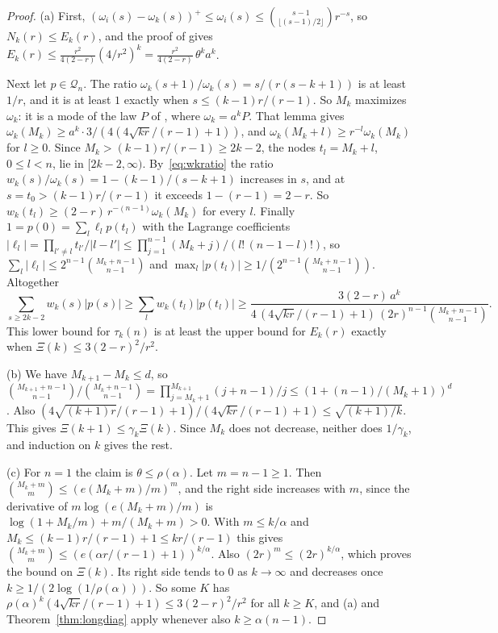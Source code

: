 \documentclass[11pt]{article}
\begin{document}
\begin{proof}
(a) First, $(\omega_i(s)-\omega_k(s))^+\le\omega_i(s)\le
\binom{s-1}{\lfloor(s-1)/2\rfloor}r^{-s}$, so $N_k(r)\le E_k(r)$, and the
proof of \cite[Corollary~3.5]{coefficient-mass-rows} gives
$E_k(r)\le\frac{r^2}{4(2-r)}(4/r^2)^k=\frac{r^2}{4(2-r)}\,\theta^ka^k$.

Next let $p\in\mathcal Q_n$.  The ratio $\omega_k(s+1)/\omega_k(s)=s/(r(s-k+1))$
is at least $1/r$, and it is at least $1$ exactly when $s\le(k-1)r/(r-1)$.  So
$M_k$ maximizes $\omega_k$: it is a mode of the law $P$ of
\cite[Lemma~3.4]{coefficient-mass-rows}, where $\omega_k=a^kP$.  That lemma gives
$\omega_k(M_k)\ge a^k\cdot3/(4(4\sqrt{kr}/(r-1)+1))$, and
$\omega_k(M_k+l)\ge r^{-l}\omega_k(M_k)$ for $l\ge0$.  Since
$M_k>(k-1)r/(r-1)\ge2k-2$, the nodes $t_l=M_k+l$, $0\le l<n$, lie in
$[2k-2,\infty)$.  By~\eqref{eq:wkratio} the ratio $w_k(s)/\omega_k(s)=1-(k-1)/(s-k+1)$
increases in $s$, and at $s=t_0>(k-1)r/(r-1)$ it exceeds $1-(r-1)=2-r$.  So
$w_k(t_l)\ge(2-r)\,r^{-(n-1)}\omega_k(M_k)$ for every $l$.  Finally
$1=p(0)=\sum_l\ell_lp(t_l)$ with the Lagrange coefficients
$|\ell_l|=\prod_{l'\ne l}t_{l'}/|l-l'|\le\prod_{j=1}^{n-1}(M_k+j)/(l!\,(n-1-l)!)$,
so $\sum_l|\ell_l|\le2^{n-1}\binom{M_k+n-1}{n-1}$ and
$\max_l|p(t_l)|\ge1/(2^{n-1}\binom{M_k+n-1}{n-1})$.  Altogether
\[
  \sum_{s\ge2k-2}w_k(s)|p(s)|\ge\sum_lw_k(t_l)|p(t_l)|
  \ge\frac{3(2-r)\,a^k}{4\,(4\sqrt{kr}/(r-1)+1)\,(2r)^{n-1}\binom{M_k+n-1}{n-1}} .
\]
This lower bound for $\tau_k(n)$ is at least the upper bound for $E_k(r)$
exactly when $\Xi(k)\le3(2-r)^2/r^2$.

(b) We have $M_{k+1}-M_k\le d$, so
$\binom{M_{k+1}+n-1}{n-1}/\binom{M_k+n-1}{n-1}=\prod_{j=M_k+1}^{M_{k+1}}(j+n-1)/j
\le(1+(n-1)/(M_k+1))^d$.  Also
$(4\sqrt{(k+1)r}/(r-1)+1)/(4\sqrt{kr}/(r-1)+1)\le\sqrt{(k+1)/k}$.  This gives
$\Xi(k+1)\le\gamma_k\Xi(k)$.  Since $M_k$ does not decrease, neither does
$1/\gamma_k$, and induction on $k$ gives the rest.

(c) For $n=1$ the claim is $\theta\le\rho(\alpha)$.  Let $m=n-1\ge1$.  Then
$\binom{M_k+m}m\le(e(M_k+m)/m)^m$, and the right side increases with $m$,
since the derivative of $m\log(e(M_k+m)/m)$ is $\log(1+M_k/m)+m/(M_k+m)>0$.
With $m\le k/\alpha$ and $M_k\le(k-1)r/(r-1)+1\le kr/(r-1)$ this gives
$\binom{M_k+m}m\le(e(\alpha r/(r-1)+1))^{k/\alpha}$.  Also
$(2r)^m\le(2r)^{k/\alpha}$, which proves the bound on $\Xi(k)$.  Its right side
tends to $0$ as $k\to\infty$ and decreases once $k\ge1/(2\log(1/\rho(\alpha)))$.
So some $K$ has $\rho(\alpha)^k(4\sqrt{kr}/(r-1)+1)\le3(2-r)^2/r^2$ for all
$k\ge K$, and (a) and Theorem~\ref{thm:longdiag} apply whenever also
$k\ge\alpha(n-1)$.
\end{proof}
\end{document}
